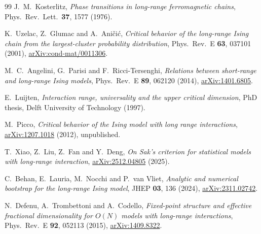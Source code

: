 \documentclass[11pt,a4paper]{article}
\numberwithin{equation}{section}
\begin{document}
\begin{thebibliography}{99}
J.~M.~Kosterlitz,
\emph{Phase transitions in long-range ferromagnetic chains},
Phys.\ Rev.\ Lett.\ \textbf{37}, 1577 (1976).

K.~Uzelac, Z.~Glumac and A.~Ani\v ci\'c,
\emph{Critical behavior of the long-range Ising chain from the largest-cluster probability
distribution}, Phys.\ Rev.\ E \textbf{63}, 037101 (2001),
\href{https://arxiv.org/abs/cond-mat/0011306}{arXiv:cond-mat/0011306}.

M.~C.~Angelini, G.~Parisi and F.~Ricci-Tersenghi,
\emph{Relations between short-range and long-range Ising models},
Phys.\ Rev.\ E \textbf{89}, 062120 (2014),
\href{https://arxiv.org/abs/1401.6805}{arXiv:1401.6805}.

E.~Luijten, \emph{Interaction range, universality and the upper critical dimension},
PhD thesis, Delft University of Technology (1997).

M.~Picco, \emph{Critical behavior of the Ising model with long range interactions},
\href{https://arxiv.org/abs/1207.1018}{arXiv:1207.1018} (2012), unpublished.

T.~Xiao, Z.~Liu, Z.~Fan and Y.~Deng,
\emph{On Sak's criterion for statistical models with long-range interaction},
\href{https://arxiv.org/abs/2512.04805}{arXiv:2512.04805} (2025).

C.~Behan, E.~Lauria, M.~Nocchi and P.~van Vliet,
\emph{Analytic and numerical bootstrap for the long-range Ising model},
JHEP \textbf{03}, 136 (2024),
\href{https://arxiv.org/abs/2311.02742}{arXiv:2311.02742}.

N.~Defenu, A.~Trombettoni and A.~Codello,
\emph{Fixed-point structure and effective fractional dimensionality for $O(N)$ models with
long-range interactions}, Phys.\ Rev.\ E \textbf{92}, 052113 (2015),
\href{https://arxiv.org/abs/1409.8322}{arXiv:1409.8322}.
\end{thebibliography}
\end{document}
